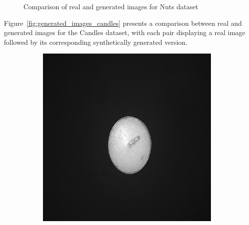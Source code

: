 \documentclass[12pt,DIV14,BCOR12mm,a4paper,footinclude=false,headinclude,parskip=half-,twoside,openright,cleardoublepage=empty,toc=index,bibliography=totoc,listof=totoc]{scrreprt}
\numberwithin{equation}{chapter}
\begin{document}
\begin{figure}
    \caption{Comparison of real and generated images for Nuts dataset}
    \label{fig:generated_images_nuts}
\end{figure}

Figure~\ref{fig:generated_images_candles} presents a comparison between real and generated images for the Candles dataset, with each pair displaying a real image followed by its corresponding synthetically generated version.

\begin{figure}
    \centering

    \begin{subfigure}[t]{0.24\textwidth}
        \centering
        \includegraphics[width=\textwidth]{../media/diff_candles_optimal_real.png}
    \end{subfigure}%
    \hspace{0.02\textwidth}
    \begin{subfigure}[t]{0.24\textwidth}
        \centering

\end{subfigure}
\end{figure}
\end{document}
